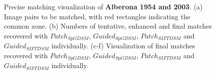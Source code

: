 \begin{figure}[htbp]
	\begin{center}
		\caption{Precise matching visualization of \textbf{Alberona 1954 and 2003}. (a) Image pairs to be matched, with red rectangles indicating the common zone. (b) Numbers of tentative, enhanced and final matches recovered with $Patch_{SpGDSM}$, $Guided_{SpGDSM}$, $Patch_{SIFTDSM}$ and $Guided_{SIFTDSM}$ individually. (c-f) Visualization of final matches recovered with $Patch_{SpGDSM}$, $Guided_{SpGDSM}$, $Patch_{SIFTDSM}$ and $Guided_{SIFTDSM}$ individually.}
		\label{MatchVizAlberona}
	\end{center}
\end{figure} 


